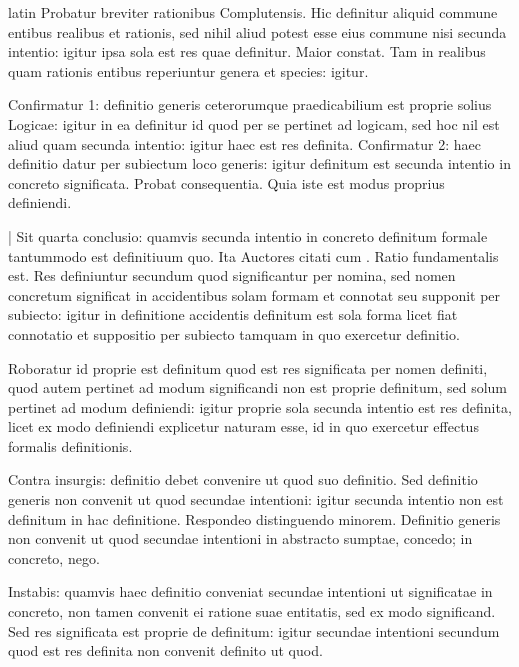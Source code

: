 \begin{otherlanguage*}{latin}
\pstart
Probatur breviter rationibus Complutensis. Hic definitur aliquid commune entibus realibus et rationis, sed nihil aliud potest esse eius commune nisi secunda intentio:
igitur ipsa sola est res quae definitur. Maior constat. Tam in realibus quam rationis entibus reperiuntur genera et species:
igitur. 
\pend

\pstart
Confirmatur 1:
definitio generis ceterorumque praedicabilium est proprie solius Logicae:
igitur in ea definitur id quod per se pertinet ad logicam, sed hoc nil est aliud quam secunda intentio:
igitur haec est res definita. Confirmatur 2:
haec definitio datur per subiectum loco generis:
igitur definitum est secunda intentio in concreto significata. Probat consequentia. Quia iste est modus proprius definiendi. 
\pend

\pstart
\textnormal{|} Sit quarta conclusio:
quamvis secunda intentio in concreto definitum formale tantummodo est definitiuum quo. Ita Auctores citati cum . Ratio fundamentalis est. Res definiuntur secundum quod significantur per nomina, sed nomen concretum significat in accidentibus solam formam et connotat seu supponit per subiecto:
igitur in definitione accidentis definitum est sola forma licet fiat connotatio et suppositio per subiecto tamquam in quo exercetur definitio. 
\pend

\pstart
Roboratur id proprie est definitum quod est res significata per nomen definiti, quod autem pertinet ad modum significandi non est proprie definitum, sed solum pertinet ad modum definiendi:
igitur proprie sola secunda intentio est res definita, licet ex modo definiendi explicetur naturam esse, id in quo exercetur effectus formalis definitionis. 
\pend

\pstart
Contra insurgis:
definitio debet convenire ut quod suo definitio. Sed definitio generis non convenit ut quod secundae intentioni:
igitur secunda intentio non est definitum in hac definitione. Respondeo distinguendo minorem. Definitio generis non convenit ut quod secundae intentioni in abstracto sumptae, concedo; in concreto, nego. 
\pend

\pstart
Instabis:
quamvis haec definitio conveniat secundae intentioni ut significatae in concreto, non tamen convenit ei ratione suae entitatis, sed ex modo significand. Sed res significata est proprie de definitum:
igitur secundae intentioni secundum quod est res definita non convenit definito ut quod. 
\pend


\end{otherlanguage*}
